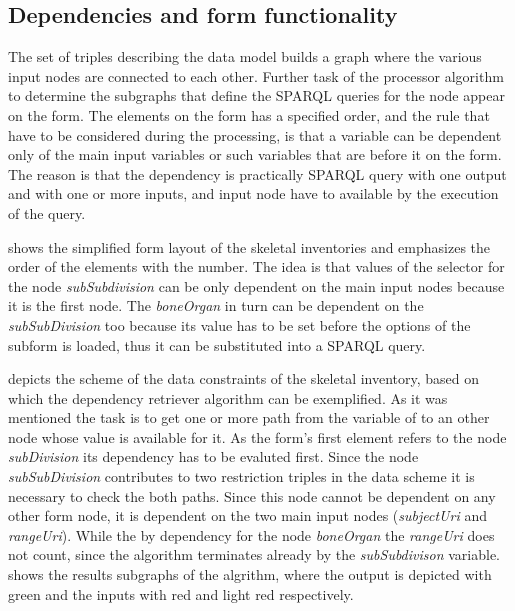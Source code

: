 \subsection{Dependencies and form functionality}  \label{512}

The set of triples describing the data model builds a graph where the various input nodes are connected to each other. Further task of the processor algorithm to determine the subgraphs that define the SPARQL queries for the node appear on the form. The elements on the form has a specified order, and the rule that have to be considered during the processing, is that a variable can be dependent only of the main input variables or such variables that are before it on the form. The reason is that the dependency is practically SPARQL query with one output and with one or more inputs, and input node have to available by the execution of the query.


 shows the simplified form layout of the skeletal inventories and emphasizes the order of the elements with the number. The idea is that values of the selector for the node \textit{subSubdivision} can be only dependent on the main input nodes because it is the first node. The \textit{boneOrgan} in turn can be dependent on the \textit{subSubDivision} too because its value has to be set before the options of the subform is loaded, thus it can be substituted into a SPARQL query.



 depicts the scheme of the data constraints of the skeletal inventory, based on which the dependency retriever algorithm can be exemplified. As it was mentioned the task is to get one or more path from the variable of to an other node whose value is available for it.  As the form's first element refers to the node \textit{subDivision} its dependency has to be evaluted first. Since the node \textit{subSubDivision} contributes to two restriction triples in the data scheme it is necessary to check the both paths. Since this node cannot be dependent on any other form node, it is dependent on the two main input nodes (\textit{subjectUri} and \textit{rangeUri}). While the by dependency for the node \textit{boneOrgan} the \textit{rangeUri}
does not count, since the algorithm terminates already by the \textit{subSubdivison} variable.  shows the results subgraphs of the algrithm, where the output is depicted with green and the inputs with red and light red respectively.

